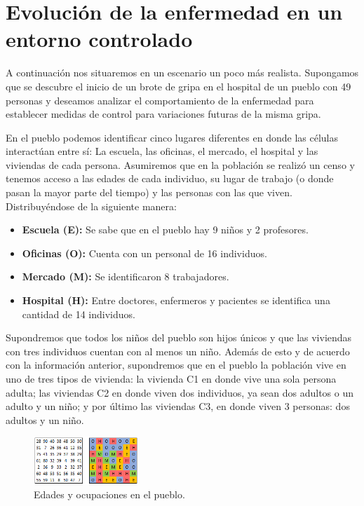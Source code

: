 \chapter{Evolución de la enfermedad en un entorno controlado}\label{cap:EvoluciónEjemploParticular}

A continuación nos situaremos en un escenario un poco más realista. Supongamos que se descubre el inicio de un brote de gripa en el hospital de un pueblo con 49 personas y deseamos analizar el comportamiento de la enfermedad para establecer medidas de control para variaciones futuras de la misma gripa.

En el pueblo podemos identificar cinco lugares diferentes en donde las células interactúan entre sí: La escuela, las oficinas, el mercado, el hospital y las viviendas de cada persona. Asumiremos que en la población se realizó un censo y tenemos acceso a las edades de cada individuo, su lugar de trabajo (o donde pasan la mayor parte del tiempo) y las personas con las que viven. Distribuyéndose de la siguiente manera:

\begin{itemize}
    \item \textbf{Escuela (E):} Se sabe que en el pueblo hay 9 niños y 2 profesores.
    \item \textbf{Oficinas (O):} Cuenta con un personal de 16 individuos.
    \item \textbf{Mercado (M):} Se identificaron 8 trabajadores.
    \item \textbf{Hospital (H):} Entre doctores, enfermeros y pacientes se identifica una cantidad de 14 individuos.
\end{itemize}

Supondremos que todos los niños del pueblo son hijos únicos y que las viviendas con tres individuos cuentan con al menos un niño. Además de esto y de acuerdo con la información anterior, supondremos que en el pueblo la población vive en uno de tres tipos de vivienda: la vivienda C1 en donde vive una sola persona adulta; las viviendas C2 en donde viven dos individuos, ya sean dos adultos o un adulto y un niño; y por último las viviendas C3, en donde viven 3 personas: dos adultos y un niño.

\begin{figure}[h]
  \centering
    \includegraphics[width=0.3525\textwidth]{Imagenes/edadesYOcupaciones.PNG}
    \caption{Edades y ocupaciones en el pueblo.}
    \label{fig:edadesYOcupaciones}
\end{figure}


